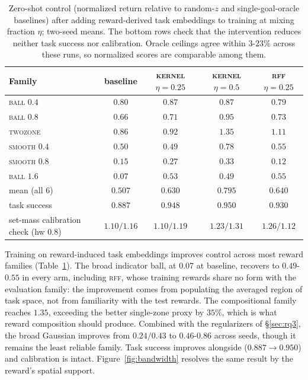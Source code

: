 \documentclass{article}
\begin{document}
\begin{table}[t]
\centering\small
\begin{tabular}{l c c c c}
\toprule
Family & baseline & \textsc{kernel} $\eta{=}0.25$ & \textsc{kernel} $\eta{=}0.5$ & \textsc{rff} $\eta{=}0.25$ \\
\midrule
\textsc{ball} $0.4$   & $0.80$ & $0.87$ & $0.87$ & $0.79$ \\
\textsc{ball} $0.8$   & $0.66$ & $0.71$ & $\mathbf{0.95}$ & $0.73$ \\
\textsc{twozone}      & $0.86$ & $0.92$ & $\mathbf{1.35}$ & $1.11$ \\
\textsc{smooth} $0.4$ & $0.50$ & $0.49$ & $\mathbf{0.78}$ & $0.55$ \\
\textsc{smooth} $0.8$ & $0.15$ & $0.27$ & $0.33$ & $0.12$ \\
\textsc{ball} $1.6$   & $0.07$ & $\mathbf{0.53}$ & $\mathbf{0.49}$ & $\mathbf{0.55}$ \\
\midrule
mean (all 6)          & $0.507$ & $0.630$ & $\mathbf{0.795}$ & $0.640$ \\
task success          & $0.887$ & $0.948$ & $0.950$ & $0.930$ \\
set-mass calibration check (hw $0.8$) & $1.10/1.16$ & $1.10/1.19$ & $1.23/1.31$ & $1.26/1.12$ \\
\bottomrule
\end{tabular}
\caption{Zero-shot control (normalized return relative to random-$z$ and single-goal-oracle baselines) after adding reward-derived task embeddings to training at mixing fraction $\eta$; two-seed means.
The bottom rows check that the intervention reduces neither task success nor calibration.
Oracle ceilings agree within $3$-$23\%$ across these runs, so normalized scores are comparable among them.}
\label{tab:rewardz}
\end{table}

Training on reward-induced task embeddings improves control across most reward families (Table~\ref{tab:rewardz}).
The broad indicator ball, at $0.07$ at baseline, recovers to $0.49$-$0.55$ in every arm, including \textsc{rff}, whose training rewards share no form with the evaluation family: the improvement comes from populating the averaged region of task space, not from familiarity with the test rewards.
The compositional family reaches $1.35$, exceeding the better single-zone proxy by $35\%$, which is what reward composition should produce.
Combined with the regularizers of \S\ref{sec:rq3}, the broad Gaussian improves from $0.24/0.43$ to $0.46$-$0.86$ across seeds, though it remains the least reliable family.
Task success improves alongside ($0.887\to0.950$) and calibration is intact.
Figure~\ref{fig:bandwidth} resolves the same result by the reward's spatial support.
\end{document}
